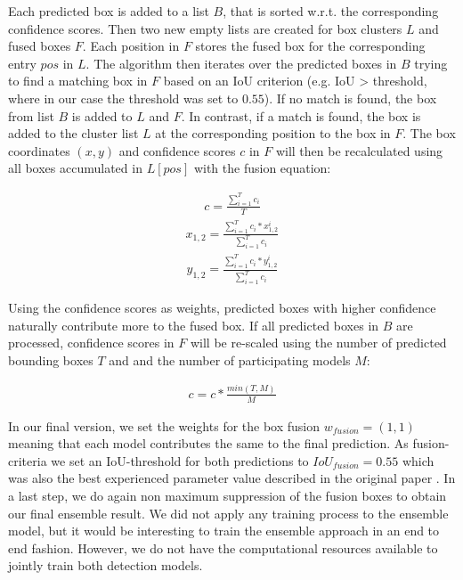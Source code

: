 Each predicted box is added to a list $B$, that is sorted w.r.t. the corresponding confidence scores. Then two new empty lists are created for box clusters $L$ and fused boxes $F$. Each position in $F$ stores the fused box for the corresponding entry $pos$ in $L$. The algorithm then iterates over the predicted boxes in $B$ trying to find a matching box in $F$ based on an \acs{IoU} criterion (e.g. \acs{IoU} > threshold, where in our case the threshold was set to $0.55$). If no match is found, the box from list $B$ is added to $L$ and $F$. In contrast, if a match is found, the box is added to the cluster list $L$ at the corresponding position to the box in $F$. The box coordinates $(x,y)$ and confidence scores $c$ in $F$ will then be recalculated using all boxes accumulated in $L[pos]$ with the fusion equation:

\begin{align}
	c = \frac{\sum_{i=1}^{T}c_i}{T}
\end{align}
\begin{align}
	x_{1,2} = \frac{\sum_{i=1}^{T} c_i * x_{1,2}^i}{\sum_{i=1}^{T} c_i}
\end{align}
\begin{align}
	y_{1,2} = \frac{\sum_{i=1}^{T} c_i * y_{1,2}^i}{\sum_{i=1}^{T} c_i}
\end{align}

Using the confidence scores as weights, predicted boxes with higher confidence naturally contribute more to the fused box.
If all predicted boxes in $B$ are processed, confidence scores in $F$ will be re-scaled using the number of predicted bounding boxes $T$ and and the number of participating models $M$:

\begin{align}
	c = c * \frac{min(T,M)}{M}
\end{align}

In our final version, we set the weights for the box fusion $w_{fusion} = (1,1)$ meaning that each model contributes the same to the final prediction.
As fusion-criteria we set an \ac{IoU}-threshold for both predictions to $IoU_{fusion} = 0.55$ which was also the best experienced parameter value described in the original paper \autocite{weightedBoxFusion}. In a last step, we do again non maximum suppression of the fusion boxes to obtain our final ensemble result. 
We did not apply any training process to the ensemble model, but it would be interesting to train the ensemble approach in an end to end fashion. However, we do not have the computational resources available to jointly train both detection models.



